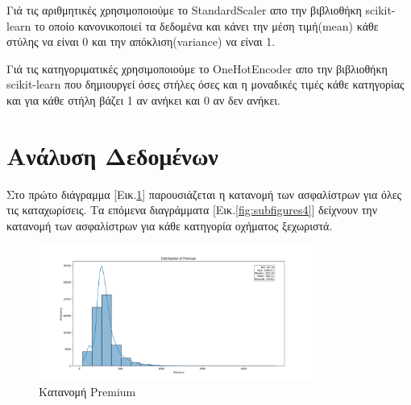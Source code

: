 \documentclass{llncs}
\begin{document}
Γιά τις αριθμητικές χρησιμοποιούμε το StandardScaler απο την βιβλιοθήκη scikit-learn το 
οποίο κανονικοποιεί τα δεδομένα και κάνει την μέση τιμή(mean) κάθε στύλης να είναι 0 και
την απόκλιση(variance) να είναι 1.

Γιά τις κατηγοριματικές χρησιμοποιούμε το OneHotEncoder απο την βιβλιοθήκη scikit-learn 
που δημιουργεί όσες στήλες όσες και η μοναδικές τιμές κάθε κατηγορίας και για κάθε στήλη 
βάζει 1 αν ανήκει και 0 αν δεν ανήκει.

\section{Ανάλυση Δεδομένων}
Στο πρώτο διάγραμμα [Εικ.\ref{fig:prem}] παρουσιάζεται η κατανομή των ασφαλίστρων για όλες τις καταχωρίσεις. Τα επόμενα διαγράμματα [Εικ.\ref{fig:subfigures4}] δείχνουν την κατανομή των ασφαλίστρων για κάθε κατηγορία οχήματος ξεχωριστά.
\begin{figure}
    \begin{center}
        \includegraphics[width=0.8\textwidth]{images/premium.png}
    \end{center}
    \caption{Κατανομή Premium} 
    \label{fig:prem}   
\end{figure}
\end{document}
